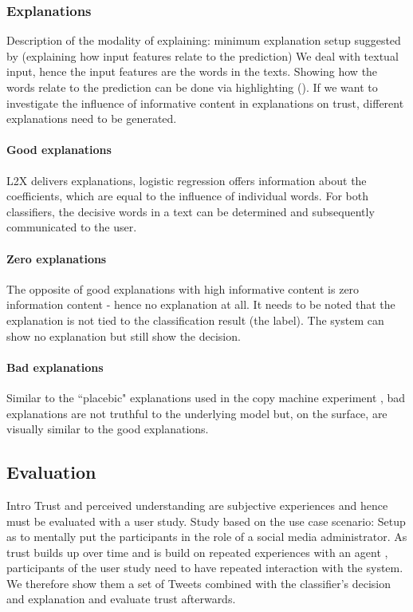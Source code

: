 \subsubsection{Explanations}
Description of the modality of explaining:\newline
minimum explanation setup suggested by \cite{goodman16eu} (explaining how input features relate to the prediction)\newline
We deal with textual input, hence the input features are the words in the texts. Showing how the words relate to the prediction can be done via highlighting (\cite{arras2017relevant, chen2012detecting, feng2018pathologies}).\newline
If we want to investigate the influence of informative content in explanations on trust, different explanations need to be generated.
\paragraph{Good explanations}
L2X delivers explanations, logistic regression offers information about the coefficients, which are equal to the influence of individual words. For both classifiers, the decisive words in a text can be determined and subsequently communicated to the user.
\paragraph{Zero explanations}
The opposite of good explanations with high informative content is zero information content - hence no explanation at all. It needs to be noted that the explanation is not tied to the classification result (the label). The system can show no explanation but still show the decision. 
\paragraph{Bad explanations}
Similar to the ``placebic" explanations used in the copy machine experiment \cite{langer1978mindlessness}, bad explanations are not truthful to the underlying model but, on the surface, are visually similar to the good explanations.  




\subsection{Evaluation}
Intro\newline
Trust and perceived understanding are subjective experiences and hence must be evaluated with a user study. Study based on the use case scenario: Setup as to mentally put the participants in the role of a social media administrator.\newline
As trust builds up over time and is build on repeated experiences with an agent \cite{rempel1985trust}, participants of the user study need to have repeated interaction with the system. We therefore show them a set of Tweets combined with the classifier's decision and explanation and evaluate trust afterwards.\newline

